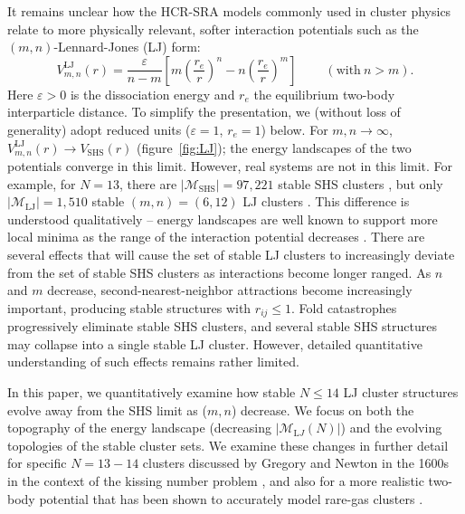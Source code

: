 It remains unclear how the HCR-SRA models commonly
used in cluster physics relate to more physically relevant, softer interaction potentials such
as the $(m,n)$-Lennard-Jones (LJ) form:
\begin{equation}
    V_{m,n}^\mathrm{LJ}(r)=\frac{\varepsilon}{n-m}\left[m\left(\frac{r_e}{r}\right)^{n}-n\left(\frac{r_e}{r}\right)^{m}\right] \ \ \ \ \ \ \ \ \ \  (\mathrm{with}\ n > m).
\label{eqn:nmpot}
\end{equation}
Here $\varepsilon>0$ is the dissociation energy and $r_e$ the equilibrium
two-body interparticle distance. To simplify the presentation,
we (without loss of generality) adopt reduced units ($\varepsilon=1$, $r_e=1$) below.
For $m,n\rightarrow \infty$,
$V_{m,n}^\mathrm{LJ}(r) \rightarrow V_\mathrm{SHS}(r)$ (figure~\ref{fig:LJ}); the
energy landscapes of the two potentials converge in this limit.  However, real
systems are not in this limit.  For example, for $N = 13$, there are $|\mathcal{M}_\mathrm{SHS}|=97,221$
stable \ac{SHS} clusters \autocite{Hoy_Structuredynamicsmodel_2015,Holmes-Cerfon_EnumeratingRigidSphere_2016},
but only $|\mathcal{M}_\mathrm{LJ}|=1,510$ stable $(m,n) = (6,12)$ LJ clusters \autocite{Doye_Evolutionpotentialenergy_1999}.  
This difference is understood qualitatively -- energy landscapes are well known to support more
local minima
as the range of the interaction potential decreases \autocite{braier90,Wales_MicroscopicBasisGlobal_2001}.
There are several effects that will cause the set of
stable LJ clusters to increasingly deviate from the set of stable \ac{SHS} clusters
as interactions become longer ranged.  As $n$ and $m$ decrease,
second-nearest-neighbor attractions become increasingly important,
producing stable structures with $r_{ij} \leq 1$.  Fold catastrophes
\autocite{Wales_MicroscopicBasisGlobal_2001,Wales_Energylandscapes_2003} progressively eliminate stable \ac{SHS} clusters, and several stable \ac{SHS}
structures may collapse into a single stable LJ cluster.  However,
detailed quantitative understanding of such effects remains rather limited.

In this paper, we quantitatively examine how stable $N \leq 14$ LJ cluster
structures evolve away from the \ac{SHS} limit as ($m, n$) decrease.  We focus on
both the topography of the energy landscape (decreasing
$|\mathcal{M}_{\mathrm LJ}(N)|$) and the evolving topologies of the stable cluster sets.
We examine these changes in further detail for specific $N = 13-14$ clusters discussed by
Gregory and Newton in the 1600s in the context of the kissing number problem
\autocite{Schutte_ProblemdreizehnKugeln_1952}, and also for a more realistic two-body potential that has
been shown to accurately model rare-gas clusters \autocite{Schwerdtfeger_ExtensionLennardJonespotential_2006}.


